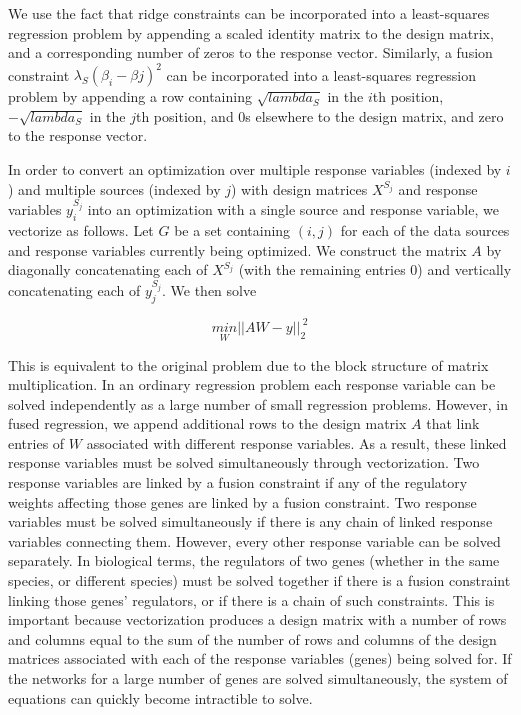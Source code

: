 \documentclass[11pt]{article}
\begin{document}
We use the fact that ridge constraints can be incorporated into a least-squares regression problem by appending a scaled identity matrix to the design matrix, and a corresponding number of zeros to the response vector. Similarly, a fusion constraint $\lambda_S (\beta_{i} - \beta{j})^2$ can be incorporated into a least-squares regression problem by appending a row containing $\sqrt{lambda_S}$ in the $i$th position, $-\sqrt{lambda_S}$ in the $j$th position, and $0$s elsewhere to the design matrix, and zero to the response vector. 

In order to convert an optimization over multiple response variables (indexed by $i$) and multiple sources (indexed by $j$) with design matrices $X^{S_j}$ and response variables $y_i^{S_j}$ into an optimization with a single source and response variable, we vectorize as follows. Let $G$ be a set containing $(i,j)$ for each of the data sources and response variables currently being optimized. We construct the matrix $A$ by diagonally concatenating each of $X^{S_j}$ (with the remaining entries 0) and vertically concatenating each of $y_j^{S_j}$. We then solve

$$\underset{W}{min} ||AW - y||_2^{~2}$$

This is equivalent to the original problem due to the block structure of matrix multiplication. In an ordinary regression problem each response variable can be solved independently as a large number of small regression problems. However, in fused regression, we append additional rows to the design matrix $A$ that link entries of $W$ associated with different response variables. As a result, these linked response variables must be solved simultaneously through vectorization. Two response variables are linked by a fusion constraint if any of the regulatory weights affecting those genes are linked by a fusion constraint. Two response variables must be solved simultaneously if there is any chain of linked response variables connecting them. However, every other response variable can be solved separately. In biological terms, the regulators of two genes (whether in the same species, or different species) must be solved together if there is a fusion constraint linking those genes' regulators, or if there is a chain of such constraints. This is important because vectorization produces a design matrix with a number of rows and columns equal to the sum of the number of rows and columns of the design matrices associated with each of the response variables (genes) being solved for. If the networks for a large number of genes are solved simultaneously, the system of equations can quickly become intractible to solve. 
\end{document}
